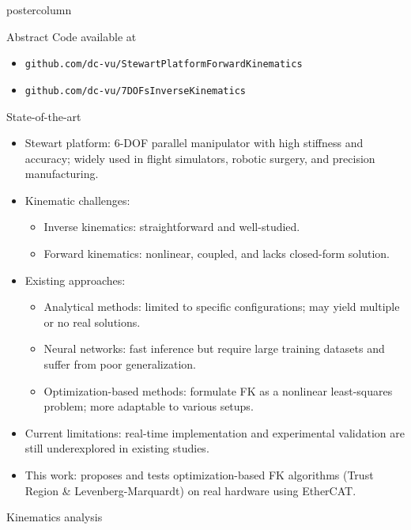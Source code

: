 \documentclass{beamer}
\begin{document}
\begin{frame}
\begin{columns}
\begin{column}{.43\textwidth}
\begin{beamercolorbox}[center]{postercolumn}
\begin{minipage}{.98\textwidth}
{\begin{myblock}{Abstract}
						Code available at
						\begin{itemize}
							\item \texttt{github.com/dc-vu/StewartPlatformForwardKinematics}
							\item \texttt{github.com/dc-vu/7DOFsInverseKinematics}
						\end{itemize}
					\end{myblock}\vfill
					\begin{myblock}{State-of-the-art}
						\begin{itemize}
							\item Stewart platform: 6-DOF parallel manipulator with high stiffness and accuracy; widely used in flight simulators, robotic surgery, and precision manufacturing.
							\item Kinematic challenges:
							\begin{itemize}
								\item Inverse kinematics: straightforward and well-studied.
								\item Forward kinematics: nonlinear, coupled, and lacks closed-form solution.
							\end{itemize}
							\item Existing approaches:
							\begin{itemize}
								\item Analytical methods: limited to specific configurations; may yield multiple or no real solutions.
								\item Neural networks: fast inference but require large training datasets and suffer from poor generalization.
								\item Optimization-based methods: formulate FK as a nonlinear least-squares problem; more adaptable to various setups.
							\end{itemize}
							\item Current limitations: real-time implementation and experimental validation are still underexplored in existing studies.
							\item This work: proposes and tests optimization-based FK algorithms (Trust Region \& Levenberg-Marquardt) on real hardware using EtherCAT.
						\end{itemize}
					\end{myblock}\vfill
					\begin{myblock}{Kinematics analysis}
						\begin{figure}
							\begin{minipage}{1\textwidth}

\end{minipage}
\end{figure}
\end{myblock}}
\end{minipage}
\end{beamercolorbox}
\end{column}
\end{columns}
\end{frame}
\end{document}

